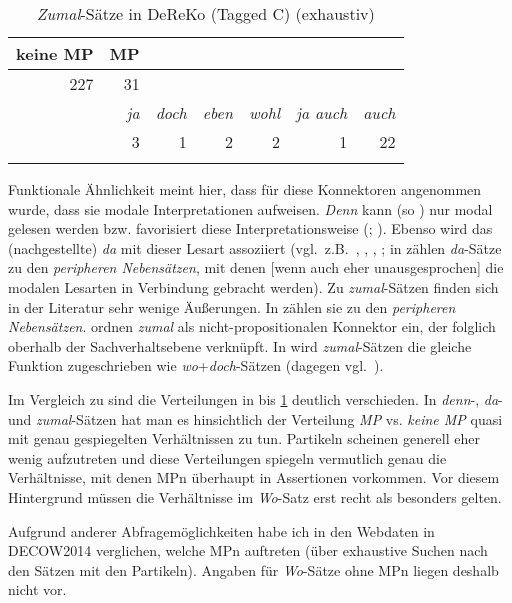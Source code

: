{\begin{table}
	\caption{\label{tab:950}\textit{Zumal}-Sätze in DeReKo (Tagged C) (exhaustiv)}
    \begin{tabular}[t]{rrrrrrr}
    \lsptoprule
    keine MP & MP & & & & & \\
    \midrule
    227 & 31\\
    & \textit{ja} & \textit{doch} & \textit{eben} & \textit{wohl} & \textit{ja auch} & \textit{auch}\\
    & 3 & 1 & 2 & 2 & 1 & 22\\
    \lspbottomrule
    \end{tabular}   
\end{table}
Funktionale Ähnlichkeit meint hier, dass für diese Konnektoren angenommen wurde, dass sie modale Interpretationen  aufweisen. \textit{Denn} kann (so \citealt[320]{Volodina2010}) nur modal gelesen werden bzw. favorisiert diese Interpretationsweise (\citealt[270]{Bluehdorn2006}; \citeyear[29]{Bluehdorn2008}). Ebenso wird das (nachgestellte) \textit{da} mit dieser Lesart assoziiert (vgl.\ z.B.\ \citealt[335]{Pasch1983}, \citealt[182]{Rosengren1987}, \citealt[2303]{Zifonun1997}, \citealt[397]{Pasch2003}; in \citealt[411, 415]{Frey2012} zählen \textit{da}-Sätze zu den \textit{peripheren Nebensätzen},  mit denen [wenn auch eher unausgesprochen] die modalen Lesarten in Verbindung gebracht werden). Zu \textit{zumal}-Sätzen finden sich in der Literatur sehr wenige Äußerungen. In \citet[6]{Bluehdorn2014} zählen sie zu den \textit{peripheren Nebensätzen}. \citet[397]{Pasch2003} ordnen \textit{zumal} als nicht-propositionalen Konnektor ein, der folglich oberhalb der Sachverhalts\-ebene verknüpft. In \citet[81]{Heidolph1981} wird \textit{zumal}-Sätzen die gleiche Funktion zugeschrieben wie \textit{wo}+\textit{doch}-Sätzen (dagegen vgl.\ \citealt[78--79]{Borst1985}).

Im Vergleich zu  sind die Verteilungen in  bis \ref{tab:950} deutlich verschieden. In \textit{denn}-,\textit{ da}- und \textit{zumal}-Sätzen hat man es hinsichtlich der Verteilung \textit{MP} vs. \textit{keine MP} quasi mit genau gespiegelten Verhältnissen zu tun. Partikeln scheinen generell eher wenig aufzutreten und diese Verteilungen spiegeln vermutlich genau die Verhältnisse, mit denen MPn überhaupt in Assertionen vorkommen. Vor diesem Hintergrund müssen die Verhältnisse im \textit{Wo}-Satz erst recht als besonders gelten.

Aufgrund anderer Abfragemöglichkeiten habe ich in den Webdaten in DECOW2014 verglichen, welche MPn auftreten (über exhaustive Suchen nach den Sätzen mit den Partikeln). Angaben für \textit{Wo}-Sätze ohne MPn liegen deshalb nicht vor.

}
